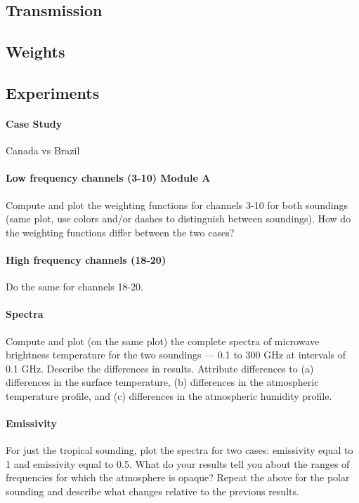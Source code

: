 \documentclass[twocol]{ametsoc}
\begin{document}
\subsection{Transmission}

\subsection{Weights}

\subsection{Experiments}

\paragraph*{Case Study} Canada vs Brazil

\paragraph{Low frequency channels (3-10) Module A }
 Compute and plot the weighting functions for channels 3-10 for both soundings (same plot, use colors and/or dashes to distinguish between soundings).  How do the weighting functions differ between the two cases?
 
\paragraph{High frequency channels (18-20)}
Do the same for channels 18-20.

\paragraph{Spectra}
Compute and plot (on the same plot) the complete spectra of microwave brightness temperature for the two soundings — 0.1 to 300 GHz at intervals of 0.1 GHz.   Describe the differences in results. 
Attribute differences to (a) differences in the surface temperature, (b) differences in the atmospheric temperature profile, and (c) differences in the atmospheric humidity profile.

\paragraph{Emissivity}
For just the tropical sounding, plot the spectra for two cases:  emissivity equal to 1  and emissivity equal to 0.5.  What do your results tell you about the ranges of frequencies for which the atmosphere is opaque?
Repeat the above for the polar sounding and describe what changes relative to the previous results.
\end{document}
